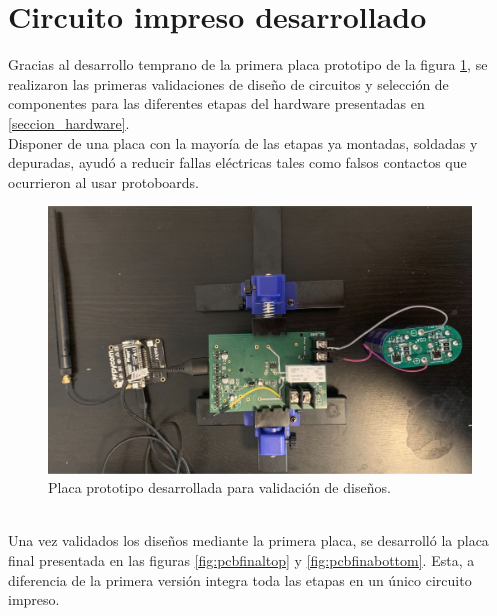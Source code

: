 \section{Circuito impreso desarrollado}
\label{sec:pruebasHW}
Gracias al desarrollo temprano de la primera placa prototipo de la figura \ref{fig:placaprototipo}, se realizaron las primeras validaciones de diseño de circuitos y selección de componentes para las diferentes etapas del hardware presentadas en \ref{seccion_hardware}.\\
Disponer de una placa con la mayoría de las etapas ya montadas, soldadas y depuradas, ayudó a reducir fallas eléctricas tales como falsos contactos que ocurrieron al usar protoboards.\\
\begin{figure}[h]
	\centering
	\includegraphics[width=0.7\linewidth]{Figures/placa_prototipo}
	\caption{Placa prototipo desarrollada para validación de diseños.}
	\label{fig:placaprototipo}
\end{figure}\\
Una vez validados los diseños mediante la primera placa, se desarrolló la placa final presentada en las figuras \ref{fig:pcbfinaltop} y \ref{fig:pcbfinabottom}. Esta, a diferencia de la primera versi\'{o}n integra toda las etapas en un único circuito impreso.\\
